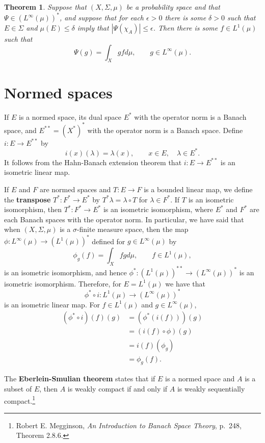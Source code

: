 \documentclass{article}
\newtheorem{theorem}{Theorem}
\theoremstyle{definition}
\begin{document}
\begin{theorem}
Suppose that $(X,\Sigma,\mu)$ be a probability space and that $\Psi \in (L^\infty(\mu))^*$, and suppose that
 for each $\epsilon>0$ there
is some $\delta>0$ such that $E \in \Sigma$ and $\mu(E) \leq \delta$ imply that
$|\Psi(\chi_A)| \leq \epsilon$.
Then there is some $f \in L^1(\mu)$ such that
\[
\Psi(g) = \int_X gf d\mu, \qquad g \in L^\infty(\mu).
\]
\label{Linfinity}
\end{theorem}


\section{Normed spaces}
If $E$ is a normed space, its dual space $E^*$ with the operator norm is a Banach space, and  $E^{**}=(X^*)^*$ with the operator
norm is a Banach space. Define $i:E \to E^{**}$ by
\[
i(x)(\lambda)=\lambda(x), \qquad x \in E, \quad \lambda \in E^*.
\]
It follows from the Hahn-Banach extension theorem that $i:E \to E^{**}$ is an isometric linear map. 

If $E$ and $F$ are normed spaces and $T:E \to F$ is a bounded linear map, we define the \textbf{transpose} $T^*:F^* \to E^*$ by
$T^* \lambda = \lambda \circ T$ for $\lambda \in F^*$. If $T$ is an isometric isomorphism, then $T^*:F^* \to E^*$ is an isometric isomorphism, where
$E^*$ and $F^*$ are each Banach spaces with the operator norm. In particular, we have said that when $(X,\Sigma,\mu)$ is a 
$\sigma$-finite measure space, then the map $\phi:L^\infty(\mu) \to (L^1(\mu))^*$ defined for $g \in L^\infty(\mu)$ by
\[
\phi_g(f) = \int_X fg d\mu, \qquad f \in L^1(\mu),
\]
is an isometric isomorphism, and hence $\phi^*:(L^1(\mu))^{**} \to (L^\infty(\mu))^*$ is an isometric isomorphism.
Therefore, for $E=L^1(\mu)$ we have that
\begin{equation}
\phi^* \circ i:L^1(\mu) \to (L^\infty(\mu))^*
\label{isometric}
\end{equation}
is an isometric linear map. For $f \in L^1(\mu)$ and $g \in L^\infty(\mu)$,
\begin{align*}
(\phi^* \circ i)(f)(g)&=(\phi^*(i(f)))(g)\\
&=(i(f) \circ \phi)(g)\\
&=i(f)(\phi_g)\\
&=\phi_g(f).
\end{align*}

The \textbf{Eberlein-Smulian theorem} states that if $E$ is a normed space and $A$ is a subset of $E$, then $A$ is weakly
compact if and only if $A$ is weakly sequentially compact.\footnote{Robert E. Megginson, {\em An Introduction to Banach
Space Theory}, p.~248, Theorem 2.8.6.}
\end{document}
